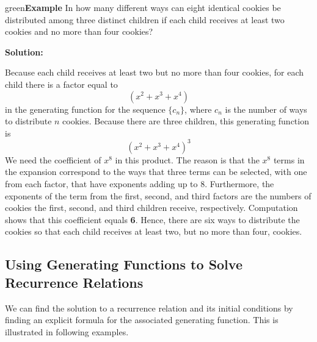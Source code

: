\documentclass[11pt]{article}
\newenvironment{example}[1][\unskip]{\begin{mybox}{green}{\textbf{Example} {#1}}}{\end{mybox}}
\begin{document}
\begin{example}
In how many different ways can eight identical cookies be distributed among three distinct children if each child receives at least two cookies and no more than four cookies?

\textbf{Solution:}

Because each child receives at least two but no more than four cookies, for each child there is a factor equal to
\begin{equation*}
    (x^2 + x^3 + x^4)
\end{equation*}
in the generating function for the sequence $\{c_n\}$, where $c_n$ is the number of ways to distribute $n$ cookies. Because there are three children, this generating function is
\begin{equation*}
    (x^2 + x^3 + x^4)^3
\end{equation*}
We need the coefficient of $x^8$ in this product. The reason is that the $x^8$ terms in the expansion correspond to the ways that three terms can be selected, with one from each factor, that have exponents adding up to 8. Furthermore, the exponents of the term from the first, second, and third factors are the numbers of cookies the first, second, and third children receive, respectively. Computation shows that this coefficient equals \textbf{6}. Hence, there are six ways to distribute the cookies so that each child receives at least two, but no more than four, cookies.
\end{example}

\subsection{Using Generating Functions to Solve Recurrence Relations}
We can find the solution to a recurrence relation and its initial conditions by finding an explicit formula for the associated generating function. This is illustrated in following examples.
\end{document}
